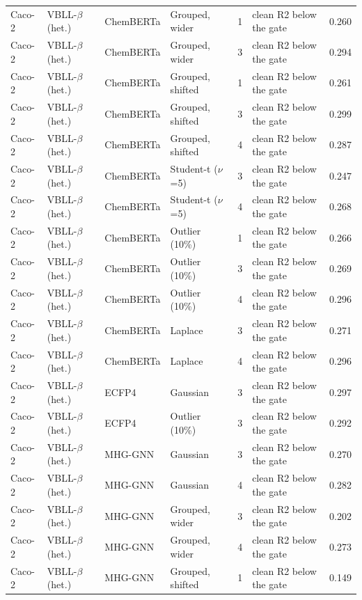 {\begin{longtable}{llllcll}
Caco-2 & VBLL-$\beta$ (het.) & ChemBERTa & Grouped, wider & 1 & clean R2 below the gate & 0.260 \\
Caco-2 & VBLL-$\beta$ (het.) & ChemBERTa & Grouped, wider & 3 & clean R2 below the gate & 0.294 \\
Caco-2 & VBLL-$\beta$ (het.) & ChemBERTa & Grouped, shifted & 1 & clean R2 below the gate & 0.261 \\
Caco-2 & VBLL-$\beta$ (het.) & ChemBERTa & Grouped, shifted & 3 & clean R2 below the gate & 0.299 \\
Caco-2 & VBLL-$\beta$ (het.) & ChemBERTa & Grouped, shifted & 4 & clean R2 below the gate & 0.287 \\
Caco-2 & VBLL-$\beta$ (het.) & ChemBERTa & Student-t ($\nu$=5) & 3 & clean R2 below the gate & 0.247 \\
Caco-2 & VBLL-$\beta$ (het.) & ChemBERTa & Student-t ($\nu$=5) & 4 & clean R2 below the gate & 0.268 \\
Caco-2 & VBLL-$\beta$ (het.) & ChemBERTa & Outlier (10\%) & 1 & clean R2 below the gate & 0.266 \\
Caco-2 & VBLL-$\beta$ (het.) & ChemBERTa & Outlier (10\%) & 3 & clean R2 below the gate & 0.269 \\
Caco-2 & VBLL-$\beta$ (het.) & ChemBERTa & Outlier (10\%) & 4 & clean R2 below the gate & 0.296 \\
Caco-2 & VBLL-$\beta$ (het.) & ChemBERTa & Laplace & 3 & clean R2 below the gate & 0.271 \\
Caco-2 & VBLL-$\beta$ (het.) & ChemBERTa & Laplace & 4 & clean R2 below the gate & 0.296 \\
Caco-2 & VBLL-$\beta$ (het.) & ECFP4 & Gaussian & 3 & clean R2 below the gate & 0.297 \\
Caco-2 & VBLL-$\beta$ (het.) & ECFP4 & Outlier (10\%) & 3 & clean R2 below the gate & 0.292 \\
Caco-2 & VBLL-$\beta$ (het.) & MHG-GNN & Gaussian & 3 & clean R2 below the gate & 0.270 \\
Caco-2 & VBLL-$\beta$ (het.) & MHG-GNN & Gaussian & 4 & clean R2 below the gate & 0.282 \\
Caco-2 & VBLL-$\beta$ (het.) & MHG-GNN & Grouped, wider & 3 & clean R2 below the gate & 0.202 \\
Caco-2 & VBLL-$\beta$ (het.) & MHG-GNN & Grouped, wider & 4 & clean R2 below the gate & 0.273 \\
Caco-2 & VBLL-$\beta$ (het.) & MHG-GNN & Grouped, shifted & 1 & clean R2 below the gate & 0.149 \\

\end{longtable}}
